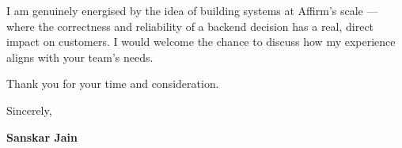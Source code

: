 \documentclass[a4paper,10pt]{article}
\begin{document}
I am genuinely energised by the idea of building systems at Affirm's scale — where the correctness and reliability of a backend decision has a real, direct impact on customers. I would welcome the chance to discuss how my experience aligns with your team's needs.

Thank you for your time and consideration.

\vspace{16pt}

Sincerely,

\vspace{24pt}

\textbf{Sanskar Jain}
\end{document}

